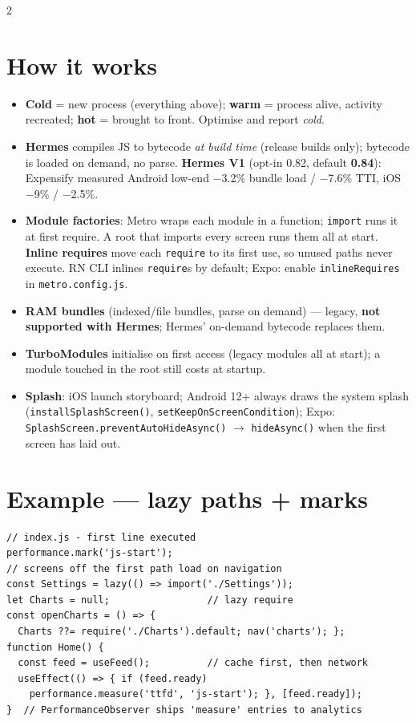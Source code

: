 \documentclass[8pt]{extarticle}
\begin{document}
\begin{multicols}{2}
\raggedright

\section{How it works}
\begin{itemize}\raggedright
  \item \textbf{Cold} = new process (everything above); \textbf{warm} = process alive, activity
        recreated; \textbf{hot} = brought to front. Optimise and report \emph{cold}.
  \item \textbf{Hermes} compiles JS to bytecode \emph{at build time} (release builds only);
        bytecode is loaded on demand, no parse. \textbf{Hermes V1} (opt-in 0.82, default
        \textbf{0.84}): Expensify measured Android low-end $-$3.2\% bundle load / $-$7.6\% TTI,
        iOS $-$9\% / $-$2.5\%.
  \item \textbf{Module factories}: Metro wraps each module in a function; \texttt{import}
        runs it at first require. A root that imports every screen runs them all at start.
        \textbf{Inline requires} move each \texttt{require} to its first use, so unused
        paths never execute. RN CLI inlines \texttt{require}s by default; Expo: enable
        \texttt{inlineRequires} in \texttt{metro.config.js}.
  \item \textbf{RAM bundles} (indexed/file bundles, parse on demand) — legacy, \textbf{not
        supported with Hermes}; Hermes' on-demand bytecode replaces them.
  \item \textbf{TurboModules} initialise on first access (legacy modules all at start); a
        module touched in the root still costs at startup.
  \item \textbf{Splash}: iOS launch storyboard; Android 12+ always draws the system
        splash (\texttt{installSplashScreen()}, \texttt{setKeepOnScreenCondition});
        Expo: \texttt{SplashScreen.preventAutoHideAsync()} $\to$ \texttt{hideAsync()} when
        the first screen has laid out.
\end{itemize}

\section{Example — lazy paths + marks}
\begin{lstlisting}[language=TSSheet]
// index.js - first line executed
performance.mark('js-start');
// screens off the first path load on navigation
const Settings = lazy(() => import('./Settings'));
let Charts = null;                 // lazy require
const openCharts = () => {
  Charts ??= require('./Charts').default; nav('charts'); };
function Home() {
  const feed = useFeed();          // cache first, then network
  useEffect(() => { if (feed.ready)
    performance.measure('ttfd', 'js-start'); }, [feed.ready]);
}  // PerformanceObserver ships 'measure' entries to analytics
\end{lstlisting}


\end{multicols}
\end{document}
